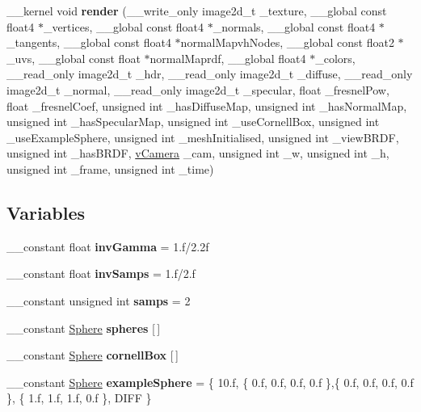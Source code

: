 \begin{DoxyCompactItemize}
\hypertarget{PathTracer_8cl_aa38e4d4f2454ce31644167af3a6b1483}{\-\_\-\-\_\-kernel void {\bfseries render} (\-\_\-\-\_\-write\-\_\-only image2d\-\_\-t \-\_\-texture, \-\_\-\-\_\-global const float4 $\ast$\-\_\-vertices, \-\_\-\-\_\-global const float4 $\ast$\-\_\-normals, \-\_\-\-\_\-global const float4 $\ast$\-\_\-tangents, \-\_\-\-\_\-global const float4 $\ast$normal\-Mapvh\-Nodes, \-\_\-\-\_\-global const float2 $\ast$\-\_\-uvs, \-\_\-\-\_\-global const float $\ast$normal\-Maprdf, \-\_\-\-\_\-global float4 $\ast$\-\_\-colors, \-\_\-\-\_\-read\-\_\-only image2d\-\_\-t \-\_\-hdr, \-\_\-\-\_\-read\-\_\-only image2d\-\_\-t \-\_\-diffuse, \-\_\-\-\_\-read\-\_\-only image2d\-\_\-t \-\_\-normal, \-\_\-\-\_\-read\-\_\-only image2d\-\_\-t \-\_\-specular, float \-\_\-fresnel\-Pow, float \-\_\-fresnel\-Coef, unsigned int \-\_\-has\-Diffuse\-Map, unsigned int \-\_\-has\-Normal\-Map, unsigned int \-\_\-has\-Specular\-Map, unsigned int \-\_\-use\-Cornell\-Box, unsigned int \-\_\-use\-Example\-Sphere, unsigned int \-\_\-mesh\-Initialised, unsigned int \-\_\-view\-B\-R\-D\-F, unsigned int \-\_\-has\-B\-R\-D\-F, \hyperlink{structvCamera}{v\-Camera} \-\_\-cam, unsigned int \-\_\-w, unsigned int \-\_\-h, unsigned int \-\_\-frame, unsigned int \-\_\-time)}\label{PathTracer_8cl_aa38e4d4f2454ce31644167af3a6b1483}

\end{DoxyCompactItemize}
\subsection*{Variables}
\begin{DoxyCompactItemize}
\item 
\hypertarget{PathTracer_8cl_a4058774024cb25b39c7ce3425b656479}{\-\_\-\-\_\-constant float {\bfseries inv\-Gamma} = 1.f/2.\-2f}\label{PathTracer_8cl_a4058774024cb25b39c7ce3425b656479}

\item 
\hypertarget{PathTracer_8cl_a3983269547766d6b0f419bc9e087b9de}{\-\_\-\-\_\-constant float {\bfseries inv\-Samps} = 1.f/2.f}\label{PathTracer_8cl_a3983269547766d6b0f419bc9e087b9de}

\item 
\hypertarget{PathTracer_8cl_a54f691129a0710a068d80cb38d668277}{\-\_\-\-\_\-constant unsigned int {\bfseries samps} = 2}\label{PathTracer_8cl_a54f691129a0710a068d80cb38d668277}

\item 
\-\_\-\-\_\-constant \hyperlink{structSphere}{Sphere} {\bfseries spheres} \mbox{[}$\,$\mbox{]}
\item 
\-\_\-\-\_\-constant \hyperlink{structSphere}{Sphere} {\bfseries cornell\-Box} \mbox{[}$\,$\mbox{]}
\item 
\hypertarget{PathTracer_8cl_ae5f24e46e2b92034a831fb57647afc4b}{\-\_\-\-\_\-constant \hyperlink{structSphere}{Sphere} {\bfseries example\-Sphere} = \{ 10.f, \{ 0.f, 0.f, 0.f, 0.f \},\{ 0.f, 0.f, 0.f, 0.f \}, \{ 1.f, 1.f, 1.f, 0.f \}, D\-I\-F\-F \}}\label{PathTracer_8cl_ae5f24e46e2b92034a831fb57647afc4b}

\end{DoxyCompactItemize}


